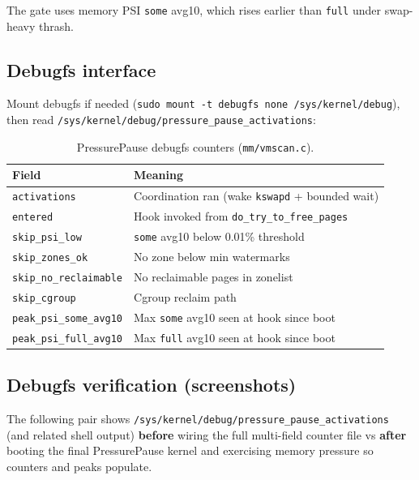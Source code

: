\documentclass[12pt,a4paper]{article}
\begin{document}
The gate uses memory PSI \texttt{some} avg10, which rises earlier than \texttt{full} under swap-heavy thrash.

\subsection{Debugfs interface}

Mount debugfs if needed (\texttt{sudo mount -t debugfs none /sys/kernel/debug}), then read \texttt{/sys/kernel/debug/pressure\_pause\_activations}:

\begin{table}[H]
\centering
\small
\begin{tabular}{@{}p{4.2cm}p{8.3cm}@{}}
\toprule
\textbf{Field} & \textbf{Meaning} \\
\midrule
\texttt{activations} & Coordination ran (wake \texttt{kswapd} + bounded wait) \\
\texttt{entered} & Hook invoked from \texttt{do\_try\_to\_free\_pages} \\
\texttt{skip\_psi\_low} & \texttt{some} avg10 below 0.01\% threshold \\
\texttt{skip\_zones\_ok} & No zone below min watermarks \\
\texttt{skip\_no\_reclaimable} & No reclaimable pages in zonelist \\
\texttt{skip\_cgroup} & Cgroup reclaim path \\
\texttt{peak\_psi\_some\_avg10} & Max \texttt{some} avg10 seen at hook since boot \\
\texttt{peak\_psi\_full\_avg10} & Max \texttt{full} avg10 seen at hook since boot \\
\bottomrule
\end{tabular}
\caption{PressurePause debugfs counters (\texttt{mm/vmscan.c}).}
\end{table}

\subsection{Debugfs verification (screenshots)}

The following pair shows \texttt{/sys/kernel/debug/pressure\_pause\_activations} (and related shell output) \textbf{before} wiring the full multi-field counter file vs \textbf{after} booting the final PressurePause kernel and exercising memory pressure so counters and peaks populate.
\end{document}
